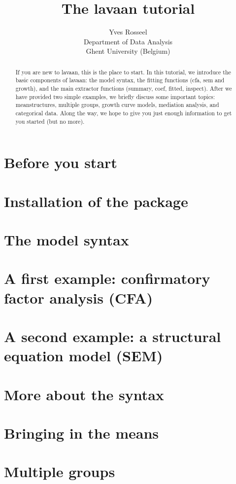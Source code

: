 \documentclass{article}
\title{The \textsf{lavaan} tutorial}
\author{Yves Rosseel\\Department of Data Analysis\\%
  Ghent University (Belgium)}
\newcommand{\pkg}[1]{{\normalfont\fontseries{b}\selectfont #1}}
\begin{document}
\maketitle
\begin{abstract}
If you are new to \pkg{lavaan}, this is the place to start. In this tutorial, we
introduce the basic components of lavaan: the model syntax, the fitting
functions (cfa, sem and growth), and the main extractor functions (summary,
coef, fitted, inspect). After we have provided two simple examples, we briefly
discuss some important topics: meanstructures, multiple groups, growth curve
models, mediation analysis, and categorical data. Along the way, we hope to
give you just enough information to get you started (but no more).
\end{abstract}

\tableofcontents

\section{Before you start}

\section{Installation of the package}

\section{The model syntax}

\section{A first example: confirmatory factor analysis (CFA)}

\section{A second example: a structural equation model (SEM)}

\section{More about the syntax}

\section{Bringing in the means}

\section{Multiple groups}

\end{document}
